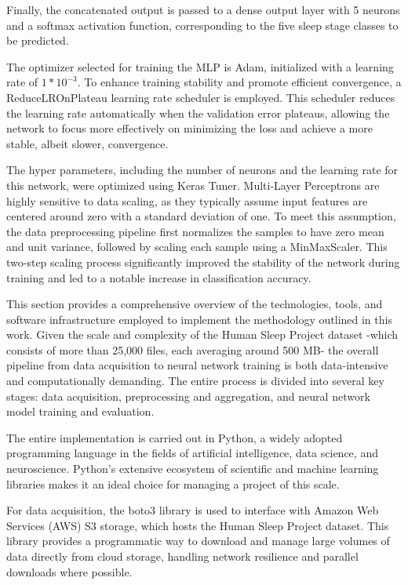 Finally, the concatenated output is passed to a dense output layer with 5 neurons and a softmax activation function, corresponding to the five sleep stage classes to be predicted.

The optimizer selected for training the MLP is Adam, initialized with a learning rate of \(1*10^{-3}\). To enhance training stability and promote efficient convergence, a ReduceLROnPlateau learning rate scheduler is employed. This scheduler reduces the learning rate automatically when the validation error plateaus, allowing the network to focus more effectively on minimizing the loss and achieve a more stable, albeit slower, convergence.

The hyper parameters, including the number of neurons and the learning rate for this network, were optimized using Keras Tuner. Multi-Layer Perceptrons are highly sensitive to data scaling, as they typically assume input features are centered around zero with a standard deviation of one. To meet this assumption, the data preprocessing pipeline first normalizes the samples to have zero mean and unit variance, followed by scaling each sample using a MinMaxScaler. This two-step scaling process significantly improved the stability of the network during training and led to a notable increase in classification accuracy.

This section provides a comprehensive overview of the technologies, tools, and software infrastructure employed to implement the methodology outlined in this work. Given the scale and complexity of the Human Sleep Project dataset -which consists of more than 25,000 files, each averaging around 500 MB- the overall pipeline from data acquisition to neural network training is both data-intensive and computationally demanding. The entire process is divided into several key stages: data acquisition, preprocessing and aggregation, and neural network model training and evaluation.

The entire implementation is carried out in Python, a widely adopted programming language in the fields of artificial intelligence, data science, and neuroscience. Python's extensive ecosystem of scientific and machine learning libraries makes it an ideal choice for managing a project of this scale.

For data acquisition, the boto3 library is used to interface with Amazon Web Services (AWS) S3 storage, which hosts the Human Sleep Project dataset. This library provides a programmatic way to download and manage large volumes of data directly from cloud storage, handling network resilience and parallel downloads where possible.

